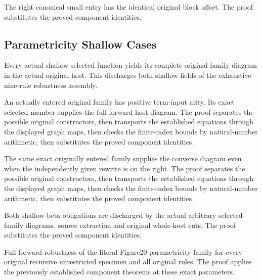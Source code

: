 The right canonical small entry has the identical original block offset.
The proof substitutes the proved component identities.
\par{}

\subsection{Parametricity Shallow Cases}
Every actual shallow selected function yields its complete original
family diagram in the actual original host. This discharges both shallow
fields of the exhaustive nine-rule robustness assembly.

An actually entered original family has positive term-input arity.
Its exact selected member supplies the full forward host diagram.
The proof separates the possible original constructors, then transports the established equations through the displayed graph maps, then checks the finite-index bounds by natural-number arithmetic, then substitutes the proved component identities.
\par{}

The same exact originally entered family supplies the converse diagram
even when the independently given rewrite is on the right.
The proof separates the possible original constructors, then transports the established equations through the displayed graph maps, then checks the finite-index bounds by natural-number arithmetic, then substitutes the proved component identities.
\par{}

Both shallow-beta obligations are discharged by the actual arbitrary
selected-family diagrams, source extraction and original whole-host cuts.
The proof substitutes the proved component identities.
\par{}

Full forward robustness of the literal Figure20 parametricity family
for every original recursive unrestricted specimen and all original rules.
The proof applies the previously established component theorems at these exact parameters.
\par{}

